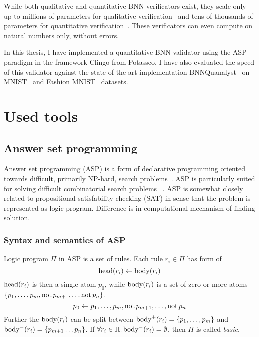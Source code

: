 \documentclass{fithesis}
\begin{document}
While both qualitative and quantitative BNN verificators exist,
they scale only up to millions of parameters for qualitative verification~\cite{10.1007/978-3-030-03592-1_16}
and tens of thousands of parameters for quantitative verification~\cite{10.1145/3563212}.
These verificators can even compute on natural numbers only, without errors.

In this thesis, I have implemented a quantitative BNN validator using the ASP paradigm
in the framework Clingo from Potassco. I have also evaluated the speed of this
validator against the state-of-the-art implementation BNNQuanalyst~\cite{10.1145/3563212}
on MNIST~\cite{mnist2017} and Fashion MNIST~\cite{xiao2017fashion} datasets.


\chapter{Used tools}

\section{Answer set programming}

Answer set programming (ASP) is a form of declarative
programming oriented towards difficult, primarily NP-hard,
search problems~\cite{lifschitz2008answer}.
ASP is particularly suited for solving difficult combinatorial search problems%
~\cite{anger2005glimpse}.
ASP is somewhat closely related to propositional
satisfability checking (SAT)
in sense that the problem is represented as logic program. Difference is in
computational mechanism of finding solution.

\subsection{Syntax and semantics of ASP}

Logic program $\Pi$ in ASP is a set of rules. Each rule $r_i\in \Pi$ has form of
\begin{equation}
    \mathrm{head}(r_i) \leftarrow{} \mathrm{body}(r_i)
\end{equation}
$\mathrm{head}(r_i)$ is then a single atom $p_0$, while $\mathrm{body}(r_i)$ is a set of zero
or more atoms $\{p_1, \dots, p_m, \mathrm{not}\, p_{m+1}, \dots \mathrm{not}\, p_n\}$.
\begin{equation}
    p_0 \leftarrow{} p_1, \dots, p_m, \mathrm{not}\, p_{m+1}, \dots, \mathrm{not}\, p_n
\end{equation}
Further the $\mathrm{body}(r_i)$ can be split between
$\mathrm{body}^+(r_i) = \{p_1, \dots, p_m\}$
and $\mathrm{body}^-(r_i) = \{p_{m+1}\dots p_n\}$.
If $\forall r_i \in \Pi.\, \mathrm{body}^-(r_i) = \emptyset$, then $\Pi$
is called \textit{basic}.
\end{document}
